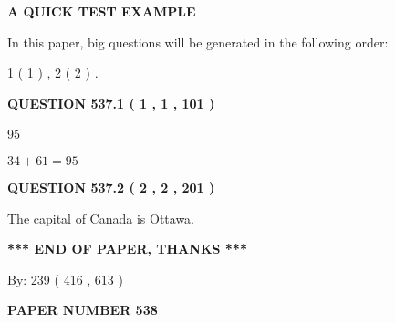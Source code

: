 \documentclass[12pt]{article}
\begin{document}
   
   
   
 \vspace{0.2in}
{\LARGE {\textbf{ A QUICK TEST EXAMPLE}}}
   
   
   
\vspace{0.2in}
   
In this paper, big questions will be generated in the following order: 
   
   
   1 ( 1 )
 ,
   2 ( 2 )
 .
  
\vspace{0.2in}
  
{\textbf{\Large{QUESTION
537.1 
 ( 1 , 1 , 101 )
}}}
  
  
 
 
\noindent{}

95
 
 
 
 
\noindent{}

$ %
34 +  %
61=   %
95$
 
 
  
\vspace{0.2in}
  
{\textbf{\Large{QUESTION
537.2 
 ( 2 , 2 , 201 )
}}}
  
  
 
 
\noindent{}
 
 
The capital of Canada is Ottawa.
 
 
 
 
   
   
 \vspace{0.2in}
 
   
   
   
   
\vspace{1.0in} 
{\textbf{\large{ *** END OF PAPER, THANKS *** }}} 
   
   
\hspace{1.0in} By: 
 239 ( 416 ,  613 )
   
   
   
   
\newpage 
\setcounter{page}{ 
   538001 } 
   
   
   
   
 {\textbf{ \Large{ PAPER NUMBER  538  }}}
   
\end{document}
